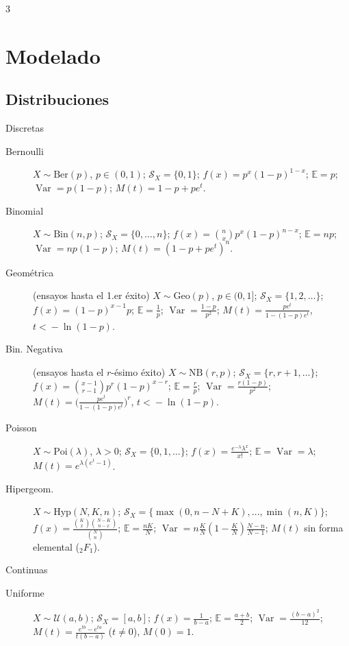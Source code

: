 \documentclass[8pt, spanish, mexico, letterpaper]{extarticle}
\newcommand{\E}{\mathbb{E}}
\newcommand{\Var}{\operatorname{Var}}
\newcommand{\<}{<}
\begin{document}
\begin{multicols*}{3}
\section{Modelado}


\subsection{Distribuciones}
Discretas
\begin{description}
\item[Bernoulli] $X\!\sim\!\mathrm{Ber}(p)$, $p\!\in\!(0,1)$; $\mathcal S_X\!=\!\{0,1\}$; $f(x)\!=\!p^x(1\!-\!p)^{1-x}$; $\E\!=\!p$; $\Var\!=\!p(1\!-\!p)$; $M(t)\!=\!1\!-\!p\!+\!pe^t$.
\item[Binomial] $X\!\sim\!\mathrm{Bin}(n,p)$; $\mathcal S_X\!=\!\{0,\dots,n\}$; $f(x)\!=\!\binom nx p^x(1\!-\!p)^{n-x}$; $\E\!=\!np$; $\Var\!=\!np(1\!-\!p)$; $M(t)\!=\!(1\!-\!p\!+\!pe^t)^n$.
\item[Geométrica] (ensayos hasta el 1.er éxito) $X\!\sim\!\mathrm{Geo}(p)$, $p\!\in\!(0,1]$; $\mathcal S_X\!=\!\{1,2,\dots\}$; $f(x)\!=\!(1\!-\!p)^{x-1}p$; $\E\!=\!\frac1p$; $\Var\!=\!\frac{1-p}{p^2}$; $M(t)\!=\!\frac{pe^t}{1-(1-p)e^t}$, $t\!<\!-\ln(1\!-\!p)$.
\item[Bin. Negativa] (ensayos hasta el $r$-ésimo éxito) $X\!\sim\!\mathrm{NB}(r,p)$; $\mathcal S_X\!=\!\{r,r\!+\!1,\dots\}$; $f(x)\!=\!\binom{x-1}{r-1}p^r(1\!-\!p)^{x-r}$; $\E\!=\!\frac rp$; $\Var\!=\!\frac{r(1-p)}{p^2}$; $M(t)\!=\!\big(\frac{pe^t}{1-(1-p)e^t}\big)^r$, $t\!<\!-\ln(1\!-\!p)$.
\item[Poisson] $X\!\sim\!\mathrm{Poi}(\lambda)$, $\lambda\!>\!0$; $\mathcal S_X\!=\!\{0,1,\dots\}$; $f(x)\!=\!\frac{e^{-\lambda}\lambda^x}{x!}$; $\E\!=\!\Var\!=\!\lambda$; $M(t)\!=\!e^{\lambda(e^t-1)}$.
\item[Hipergeom.] $X\!\sim\!\mathrm{Hyp}(N,K,n)$; $\mathcal S_X\!=\!\{\max(0,n\!-\!N\!+\!K),\dots,\min(n,K)\}$; $f(x)\!=\!\frac{\binom Kx\binom{N-K}{n-x}}{\binom Nn}$; $\E\!=\!\frac{nK}N$; $\Var\!=\!n\frac KN(1\!-\!\frac KN)\frac{N-n}{N-1}$; $M(t)$ sin forma elemental (${}_2F_1$).
\end{description}
Continuas
\begin{description}
\item[Uniforme] $X\!\sim\!\mathcal U(a,b)$; $\mathcal S_X\!=\![a,b]$; $f(x)\!=\!\frac1{b-a}$; $\E\!=\!\frac{a+b}2$; $\Var\!=\!\frac{(b-a)^2}{12}$; $M(t)\!=\!\frac{e^{tb}-e^{ta}}{t(b-a)}$ ($t\!\neq\!0$), $M(0)\!=\!1$.

\end{description}
\end{multicols*}
\end{document}
